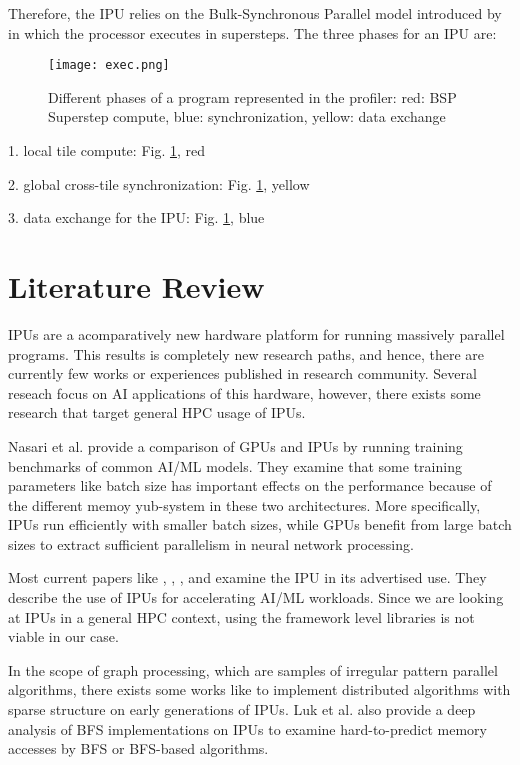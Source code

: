 \documentclass[a4paper,UKenglish,cleveref, autoref, thm-restate]{oasics-v2021}
\begin{document}
Therefore, the IPU relies on the Bulk-Synchronous Parallel model introduced by \cite{valiant} in which the processor executes in supersteps. The three phases for an IPU are:

\begin{figure}[htbp]
	\centerline{\texttt{[image: exec.png]}}
	\caption{Different phases of a program represented in the profiler: red: BSP Superstep compute, blue: synchronization, yellow: data exchange}
	\label{fig:exec}
\end{figure}

1. local tile compute: Fig. \ref{fig:exec}, red

2. global cross-tile synchronization: Fig. \ref{fig:exec}, yellow 

3. data exchange for the IPU: Fig. \ref{fig:exec}, blue \cite{b8}



\section{Literature Review}
IPUs are a acomparatively new hardware platform for running massively parallel programs. This results is completely new research paths, and hence, there are currently few works or experiences published in research community. Several reseach focus on AI applications of this hardware, however, there exists some research that target general HPC usage of IPUs.

Nasari et al.  \cite{ipu_ML_bench1} provide a comparison of GPUs and IPUs by running training benchmarks of common AI/ML models. They examine that some training parameters like batch size has important effects on the performance because of the different memoy yub-system in these two architectures. More specifically, IPUs run efficiently with smaller batch sizes, while GPUs benefit from large batch sizes to extract sufficient parallelism in neural network processing.

Most current papers like \cite{Conf-ML}, \cite{Dyn_Sparse}, \cite{Qwant}, and \cite{literature3} examine the IPU in its advertised use. They describe the use of IPUs for accelerating AI/ML workloads. Since we are looking at IPUs in a general HPC context, using the framework level libraries is not viable in our case. 

In the scope of graph processing, which are samples of irregular pattern parallel algorithms, there exists some works like  \cite{ipu_graph1} to implement distributed algorithms with sparse structure on early generations of IPUs. Luk et al.  \cite{Luk1} also provide a deep analysis of BFS implementations on IPUs to examine hard-to-predict memory accesses by BFS or BFS-based algorithms.
\end{document}
